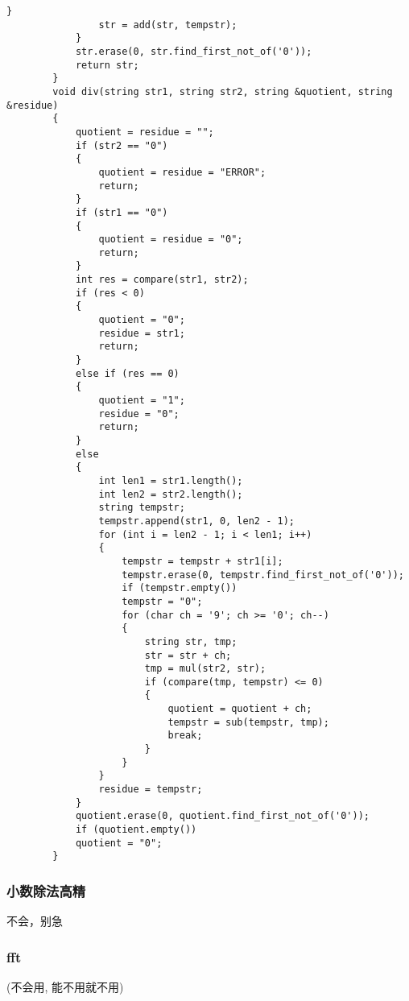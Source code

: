 \documentclass[12pt, a4paper]{ctexart}
\begin{document}
\begin{lstlisting}[caption={}]
				}
				str = add(str, tempstr);
			}
			str.erase(0, str.find_first_not_of('0'));
			return str;
		}
		void div(string str1, string str2, string &quotient, string &residue)
		{
			quotient = residue = "";
			if (str2 == "0")
			{
				quotient = residue = "ERROR";
				return;
			}
			if (str1 == "0")
			{
				quotient = residue = "0";
				return;
			}
			int res = compare(str1, str2);
			if (res < 0)
			{
				quotient = "0";
				residue = str1;
				return;
			}
			else if (res == 0)
			{
				quotient = "1";
				residue = "0";
				return;
			}
			else
			{
				int len1 = str1.length();
				int len2 = str2.length();
				string tempstr;
				tempstr.append(str1, 0, len2 - 1);
				for (int i = len2 - 1; i < len1; i++)
				{
					tempstr = tempstr + str1[i];
					tempstr.erase(0, tempstr.find_first_not_of('0'));
					if (tempstr.empty())
					tempstr = "0";
					for (char ch = '9'; ch >= '0'; ch--)
					{
						string str, tmp;
						str = str + ch;
						tmp = mul(str2, str);
						if (compare(tmp, tempstr) <= 0)
						{
							quotient = quotient + ch;
							tempstr = sub(tempstr, tmp);
							break;
						}
					}
				}
				residue = tempstr;
			}
			quotient.erase(0, quotient.find_first_not_of('0'));
			if (quotient.empty())
			quotient = "0";
		}
	\end{lstlisting}
	
	\subsubsection{小数除法高精}
	
	不会，别急
	
	\subsubsection{fft}
	
	(不会用, 能不用就不用)
	
\end{document}
